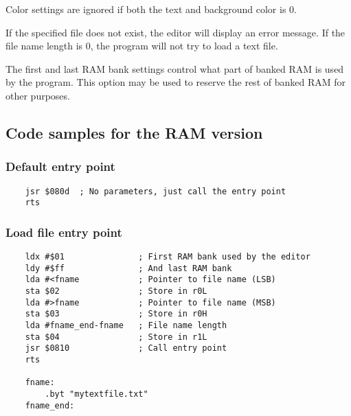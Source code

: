 \documentclass{article}
\begin{document}
        Color settings are ignored if both the text and background color is 0.

        If the specified file does not exist, the editor will display an
        error message. If the file name length is 0, the program will not try
        to load a text file.

        The first and last RAM bank settings control what part of banked RAM is
        used by the program. This option may be used to reserve the rest of banked RAM
        for other purposes.

    \subsection{Code samples for the RAM version}

    \subsubsection{Default entry point}
\begin{verbatim}
    jsr $080d  ; No parameters, just call the entry point
    rts
\end{verbatim}

    \subsubsection{Load file entry point}
\begin{verbatim}
    ldx #$01               ; First RAM bank used by the editor
    ldy #$ff               ; And last RAM bank
    lda #<fname            ; Pointer to file name (LSB)
    sta $02                ; Store in r0L
    lda #>fname            ; Pointer to file name (MSB)
    sta $03                ; Store in r0H
    lda #fname_end-fname   ; File name length
    sta $04                ; Store in r1L
    jsr $0810              ; Call entry point
    rts

    fname:
        .byt "mytextfile.txt"
    fname_end:
\end{verbatim}
\end{document}
